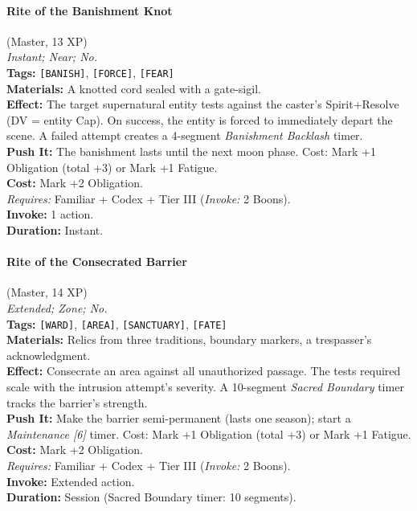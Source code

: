 \paragraph{Rite of the Banishment Knot} (Master, 13 XP) \hfill \\
\emph{Instant; Near; No.} \\
\textbf{Tags:} \texttt{[BANISH]}, \texttt{[FORCE]}, \texttt{[FEAR]} \\
\textbf{Materials:} A knotted cord sealed with a gate-sigil. \\
\textbf{Effect:} The target supernatural entity tests against the caster's Spirit+Resolve (DV = entity Cap). On success, the entity is forced to immediately depart the scene. A failed attempt creates a 4-segment \textit{Banishment Backlash} timer. \\
\textbf{Push It:} The banishment lasts until the next moon phase. Cost: Mark +1 Obligation (total +3) or Mark +1 Fatigue. \\
\textbf{Cost:} Mark +2 Obligation. \\
\textit{Requires:} Familiar + Codex + Tier III (\textit{Invoke:} 2 Boons). \\
\textbf{Invoke:} 1 action. \\
\textbf{Duration:} Instant.

\paragraph{Rite of the Consecrated Barrier} (Master, 14 XP) \hfill \\
\emph{Extended; Zone; No.} \\
\textbf{Tags:} \texttt{[WARD]}, \texttt{[AREA]}, \texttt{[SANCTUARY]}, \texttt{[FATE]} \\
\textbf{Materials:} Relics from three traditions, boundary markers, a trespasser's acknowledgment. \\
\textbf{Effect:} Consecrate an area against all unauthorized passage. The tests required scale with the intrusion attempt's severity. A 10-segment \textit{Sacred Boundary} timer tracks the barrier's strength. \\
\textbf{Push It:} Make the barrier semi-permanent (lasts one season); start a \textit{Maintenance [6]} timer. Cost: Mark +1 Obligation (total +3) or Mark +1 Fatigue. \\
\textbf{Cost:} Mark +2 Obligation. \\
\textit{Requires:} Familiar + Codex + Tier III (\textit{Invoke:} 2 Boons). \\
\textbf{Invoke:} Extended action. \\
\textbf{Duration:} Session (Sacred Boundary timer: 10 segments).


